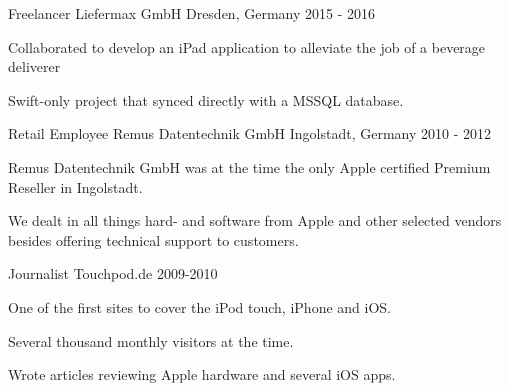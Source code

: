 \begin{cventries}
\cventry
	{Freelancer}
	{Liefermax GmbH}
	{Dresden, Germany}
	{2015 - 2016}
	{
		\begin{cvitems}
			\item {Collaborated to develop an iPad application to alleviate the job of a beverage deliverer}
			\item {Swift-only project that synced directly with a MSSQL database.}
		\end{cvitems}
	}

	
\cventry
	{Retail Employee}
	{Remus Datentechnik GmbH}
	{Ingolstadt, Germany}
	{2010 - 2012}
	{
		\begin{cvitems}
			\item {Remus Datentechnik GmbH was at the time the only Apple certified Premium Reseller in Ingolstadt.}
			\item {We dealt in all things hard- and software from Apple and other selected vendors besides offering technical support to customers.}
		\end{cvitems}
	}
	
\cventry
	{Journalist}
	{Touchpod.de}
	{}
	{2009-2010}
	{
		\begin{cvitems}
			\item {One of the first sites to cover the iPod touch, iPhone and iOS.}
			\item {Several thousand monthly visitors at the time.}
			\item {Wrote articles reviewing Apple hardware and several iOS apps.}
		\end{cvitems}
	}

\end{cventries}
